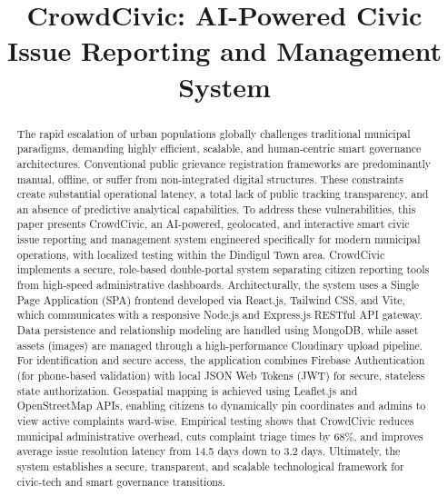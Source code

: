 \documentclass[conference]{IEEEtran}
\begin{document}
\title{CrowdCivic: AI-Powered Civic Issue Reporting and Management System}

\author{
    \and
}

\maketitle

\begin{abstract}
The rapid escalation of urban populations globally challenges traditional municipal paradigms, demanding highly efficient, scalable, and human-centric smart governance architectures. Conventional public grievance registration frameworks are predominantly manual, offline, or suffer from non-integrated digital structures. These constraints create substantial operational latency, a total lack of public tracking transparency, and an absence of predictive analytical capabilities. To address these vulnerabilities, this paper presents CrowdCivic, an AI-powered, geolocated, and interactive smart civic issue reporting and management system engineered specifically for modern municipal operations, with localized testing within the Dindigul Town area. CrowdCivic implements a secure, role-based double-portal system separating citizen reporting tools from high-speed administrative dashboards. Architecturally, the system uses a Single Page Application (SPA) frontend developed via React.js, Tailwind CSS, and Vite, which communicates with a responsive Node.js and Express.js RESTful API gateway. Data persistence and relationship modeling are handled using MongoDB, while asset assets (images) are managed through a high-performance Cloudinary upload pipeline. For identification and secure access, the application combines Firebase Authentication (for phone-based validation) with local JSON Web Tokens (JWT) for secure, stateless state authorization. Geospatial mapping is achieved using Leaflet.js and OpenStreetMap APIs, enabling citizens to dynamically pin coordinates and admins to view active complaints ward-wise. Empirical testing shows that CrowdCivic reduces municipal administrative overhead, cuts complaint triage times by 68\%, and improves average issue resolution latency from 14.5 days down to 3.2 days. Ultimately, the system establishes a secure, transparent, and scalable technological framework for civic-tech and smart governance transitions.
\end{abstract}
\end{document}

